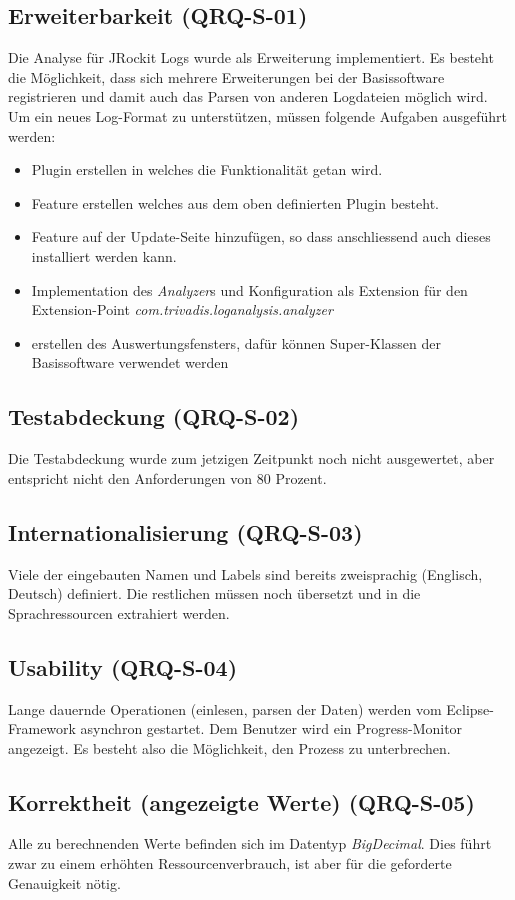 \subsection{Erweiterbarkeit (QRQ-S-01)}
Die Analyse für JRockit Logs wurde als Erweiterung implementiert. Es besteht die Möglichkeit, dass sich mehrere Erweiterungen bei der Basissoftware registrieren und damit auch das Parsen von anderen Logdateien möglich wird. Um ein neues Log-Format zu unterstützen, müssen folgende Aufgaben ausgeführt werden:
\begin{itemize}
\item Plugin erstellen in welches die Funktionalität getan wird.
\item Feature erstellen welches aus dem oben definierten Plugin besteht.
\item Feature auf der Update-Seite hinzufügen, so dass anschliessend auch dieses installiert werden kann.
\item Implementation des \textit{Analyzer}s und Konfiguration als Extension für den Extension-Point \textit{com.trivadis.loganalysis.analyzer}
\item erstellen des Auswertungsfensters, dafür können Super-Klassen der Basissoftware verwendet werden
\end{itemize}

\subsection{Testabdeckung (QRQ-S-02)}
Die Testabdeckung wurde zum jetzigen Zeitpunkt noch nicht ausgewertet, aber entspricht nicht den Anforderungen von 80 Prozent.
\subsection{Internationalisierung (QRQ-S-03)}
Viele der eingebauten Namen und Labels sind bereits zweisprachig (Englisch, Deutsch) definiert. Die restlichen müssen noch übersetzt und in die Sprachressourcen extrahiert werden.

\subsection{Usability (QRQ-S-04)}
Lange dauernde Operationen (einlesen, parsen der Daten) werden vom Eclipse-Framework asynchron gestartet. Dem Benutzer wird ein Progress-Monitor angezeigt. Es besteht also die Möglichkeit, den Prozess zu unterbrechen.

\subsection{Korrektheit (angezeigte Werte) (QRQ-S-05)}
Alle zu berechnenden Werte befinden sich im Datentyp \textit{BigDecimal}. Dies führt zwar zu einem erhöhten Ressourcenverbrauch, ist aber für die geforderte Genauigkeit nötig.